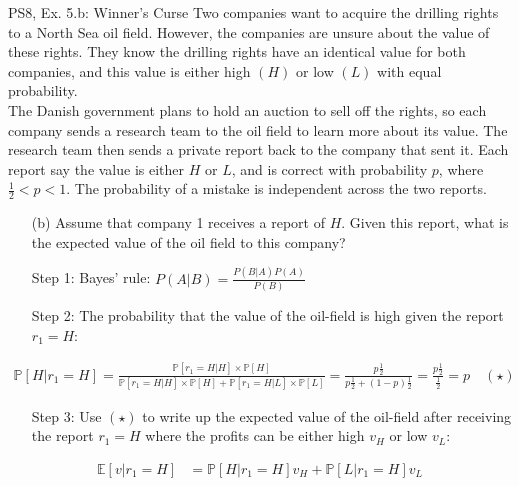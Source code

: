 \begin{frame}{PS8, Ex. 5.b: Winner's Curse}
      Two companies want to acquire the drilling rights to a North Sea oil field. However, the companies are unsure about the value of these rights. They know the drilling rights have an identical value for both companies, and this value is either high $(H)$ or low $(L)$ with equal probability.\\\smallskip
      The Danish government plans to hold an auction to sell off the rights, so each company sends a research team to the oil field to learn more about its value. The research team then sends a private report back to the company that sent it. Each report say the value is either $H$ or $L$, and is correct with probability $p$, where $\frac{1}{2} < p < 1$. The probability of a mistake is independent across the two reports.
      \begin{itemize}
        \item[(b)] Assume that company 1 receives a report of $H$. Given this report, what is the expected value of the oil field to this company?
        \item[Step 1:] Bayes' rule: $P(A|B)=\frac{P(B|A)P(A)}{P(B)}$
        \item[Step 2:] The probability that the value of the oil-field is high given the report $r_1=H$:
        \end{itemize}
        \vspace{-8pt}
        \begin{align*}
          \mathbb{P}[H|r_1=H]=\frac{\mathbb{P}[r_1=H|H]\times\mathbb{P}[H]}{\mathbb{P}[r_1=H|H]\times\mathbb{P}[H]+\mathbb{P}[r_1=H|L]\times\mathbb{P}[L]}=\frac{p\frac{1}{2}}{p\frac{1}{2}+(1-p)\frac{1}{2}}=\frac{p\frac{1}{2}}{\frac{1}{2}}=p\quad (\star)
        \end{align*}
        \vspace{-10pt}
        \begin{itemize}
        \item[Step 3:] Use $(\star)$ to write up the expected value of the oil-field after receiving the report $r_1=H$ where the profits can be either high $v_H$ or low $v_L$:
      \end{itemize}
      \vspace{-6pt}
      \begin{align*}
        \mathbb{E}[v|r_1=H]&=\mathbb{P}[H|r_1=H]v_H+\mathbb{P}[L|r_1=H]v_L
      \end{align*}
      \vfill\null
\end{frame}
